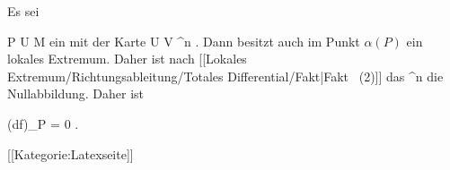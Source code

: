 Es sei

\mavergleichskette
{\vergleichskette
{ P
}
{ \in }{  U
}
{ \subseteq }{ M
}
{    }{
}
{   }{
}
}
{}{}{}
ein
mit der Karte
\maabb {\alpha} { U } {V \subseteq \R^n
} {.}
Dann besitzt auch
 im Punkt $\alpha(P)$ ein lokales Extremum.
Daher ist nach
[[Lokales Extremum/Richtungsableitung/Totales Differential/Fakt|Fakt   (2)]]
das
 {\R^n } {\R
} {}
die Nullabbildung. Daher ist

\mavergleichskette
{\vergleichskette
{ (df)_P
}
{ = }{ 0
}
{  }{
}
{    }{
}
{   }{
}
}
{}{}{.}

 [[Kategorie:Latexseite]]

